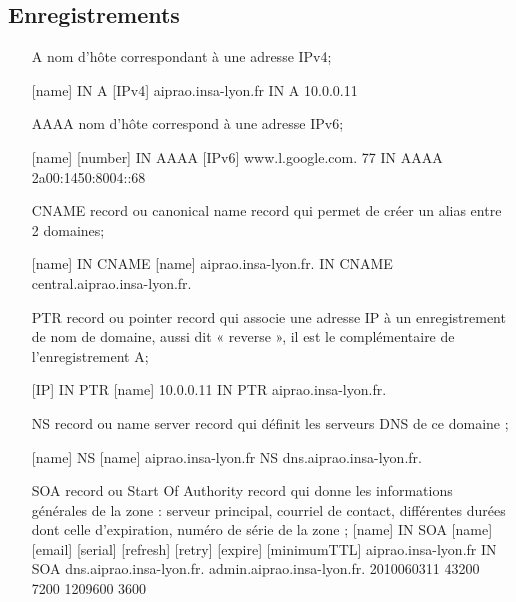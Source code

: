 \subsection{Enregistrements}
\begin{itemize}
\item[A] nom d'hôte correspondant à une adresse IPv4;

[name] IN A [IPv4]
aiprao.insa-lyon.fr  IN      A       10.0.0.11

\item[AAAA] nom d'hôte correspond à une adresse IPv6;

[name] [number] IN AAAA [IPv6]
www.l.google.com.       77      IN      AAAA    2a00:1450:8004::68

\item[CNAME] record ou canonical name record qui permet de créer un alias entre 2 domaines;

[name] IN CNAME [name]
aiprao.insa-lyon.fr.              IN      CNAME       central.aiprao.insa-lyon.fr.

\item[PTR] record ou pointer record qui associe une adresse IP à un enregistrement de nom de domaine, aussi dit « reverse », il est le complémentaire de l'enregistrement A;

[IP] IN PTR [name]
10.0.0.11  IN   PTR     aiprao.insa-lyon.fr.

\item[NS] record ou name server record qui définit les serveurs DNS de ce domaine ;

[name] NS [name]
aiprao.insa-lyon.fr      NS  dns.aiprao.insa-lyon.fr.

\item[SOA] record ou Start Of Authority record qui donne les informations générales de la zone : serveur principal, courriel de contact, différentes durées dont celle d'expiration, numéro de série de la zone ;
[name] IN SOA [name] [email] [serial] [refresh] [retry] [expire] [minimumTTL]
aiprao.insa-lyon.fr	IN      SOA     dns.aiprao.insa-lyon.fr. admin.aiprao.insa-lyon.fr. 2010060311 43200 7200 1209600 3600
\end{itemize}
